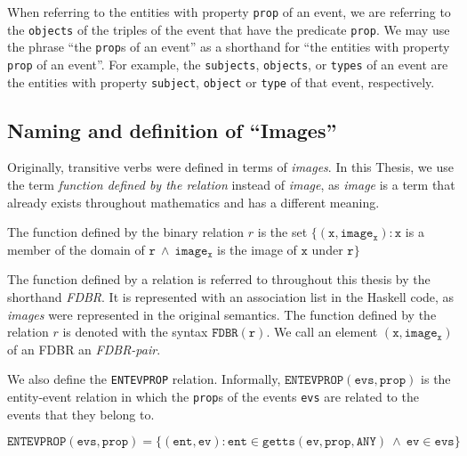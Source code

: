 \documentclass[../main.tex]{subfiles}
\begin{document}
When referring to the entities with property \texttt{prop} of an event, we are referring to the \texttt{objects} of the triples of the event that have the predicate \texttt{prop}.
We may use the phrase ``the \texttt{prop}s of an event'' as a shorthand for ``the entities with property \texttt{prop} of an event''.
For example, the \texttt{subjects}, \texttt{objects}, or \texttt{types} of an event are the entities with property \texttt{subject}, \texttt{object} or \texttt{type} of that event, respectively.

\subsection{Naming and definition of ``Images''}

Originally, transitive verbs were defined in terms of {\em images}\cite{frost2014denotational}.
In this Thesis, we use the term {\em function defined by the relation} instead of {\em image}, as {\em image} is a term that already exists throughout mathematics and has
a different meaning.

\begin{definition}
	The function defined by the binary relation $r$ is the set $\{(\mathtt{x}, \mathtt{image_x}) : \mathtt{x}$ is a member of the domain of $\mathtt{r} \ \wedge \  \mathtt{image_x}$ is the image of $\mathtt{x}$ under $\mathtt{r} \}$
\end{definition}

The function defined by a relation is referred to throughout this thesis by the shorthand {\em FDBR}.  It is represented with an association list in the Haskell code,
as {\em images} were represented in the original semantics.  The function defined by the relation $r$ is denoted with the syntax $\mathtt{FDBR}(\mathtt{r})$.
We call an element $\mathtt{(x, image_x)}$ of an FDBR an {\em FDBR-pair}.

We also define the \texttt{ENTEVPROP} relation.  Informally, $\mathtt{ENTEVPROP}(\mathtt{evs}, \mathtt{prop})$ is the entity-event relation in which the \texttt{prop}s of the events \texttt{evs} are related to the events that they belong to.

\begin{definition}
	\[\mathtt{ENTEVPROP}(\mathtt{evs}, \mathtt{prop}) = \{(\mathtt{ent}, \mathtt{ev}) : \mathtt{ent} \in \mathtt{getts}(\mathtt{ev}, \mathtt{prop}, \mathtt{ANY}) \ \wedge \ \mathtt{ev} \in \mathtt{evs} \}\]
\end{definition}
\end{document}
